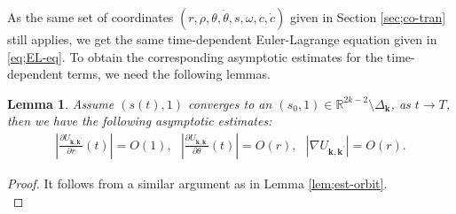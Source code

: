 \documentclass[11pt]{amsart}
\newtheorem{lemma}[theorem]{Lemma}
\theoremstyle{definition}
\theoremstyle{remark}
\numberwithin{equation}{section}
\newcommand{\rr}{\mathbb R}
\newcommand{\tht}{\theta}
\newcommand{\om}{\omega}
\newcommand{\bk}{\mathbf k}
\begin{document}
As the same set of coordinates $(r, \rho, \tht, \dot{\tht}, s, \om, c, \dot{c})$ given in Section \ref{sec;co-tran} still applies, we get the same time-dependent Euler-Lagrange equation given in \eqref{eq;EL-eq}. To obtain the corresponding asymptotic estimates for the time-dependent terms, we need the following lemmas.
\begin{lemma}
\label{lem;est-col-orbit}
    Assume $(s(t),1)$ converges to an $(s_0, 1) \in \rr^{2k-2} \setminus \Delta_{\bk}$, as $t\rightarrow T$, then we  have the following asymptotic estimates:
    \begin{align}
       \left| \frac{\partial U_{\mathbf{k},\mathbf{k}^\prime}}{\partial r}(t) \right|=O(1),\ \ \ \left|\frac{\partial U_{\mathbf{k},\mathbf{k}^\prime}}{\partial \theta}(t)\right|=O(r),\ \ \ |\nabla U_{\mathbf{k},\mathbf{k^\prime}}|=O(r).
    \end{align}
\end{lemma}
\begin{proof}
It follows from a similar argument as in Lemma \ref{lem;est-orbit}.\\
\end{proof}
\end{document}
